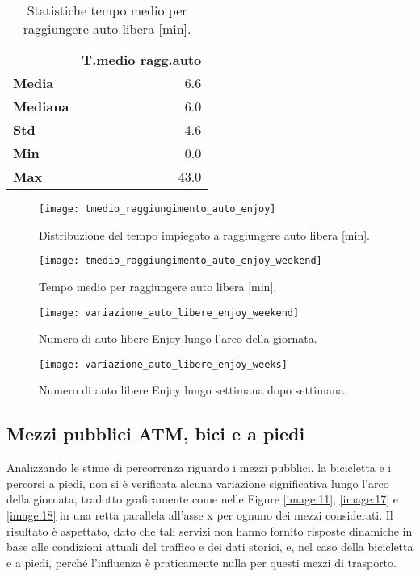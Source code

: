\begin{table}[H]
	\centering
	\begin{tabular}{ | l r | }
		\hline
		& \textbf{T.medio ragg.auto} \\
		\textbf{Media}   &  6.6 \\
		\textbf{Mediana} &  6.0 \\
		\textbf{Std}     &  4.6 \\
		\textbf{Min}     &  0.0 \\ 
		\textbf{Max}     & 43.0 \\
		\hline
	\end{tabular}
	\caption{Statistiche tempo medio per raggiungere auto libera [min].}
	\label{table:4}
\end{table}

\begin{figure}[H]
	\centering
	\texttt{[image: tmedio\_raggiungimento\_auto\_enjoy]}
	\caption{Distribuzione del tempo impiegato a raggiungere auto libera [min].}
	\label{image:8}
\end{figure}

\begin{figure}
	\centering
	\texttt{[image: tmedio\_raggiungimento\_auto\_enjoy\_weekend]}
	\caption{Tempo medio per raggiungere auto libera [min].}
	\label{image:21}
\end{figure}

\begin{figure}
	\centering
	\texttt{[image: variazione\_auto\_libere\_enjoy\_weekend]}
	\caption{Numero di auto libere Enjoy lungo l'arco della giornata.}
	\label{image:9}
\end{figure}

\begin{figure}
\centering
\texttt{[image: variazione\_auto\_libere\_enjoy\_weeks]}
\caption{Numero di auto libere Enjoy lungo settimana dopo settimana.}
\label{image:10}
\end{figure}

\pagebreak

\subsection{Mezzi pubblici ATM, bici e a piedi}

Analizzando le stime di percorrenza riguardo i mezzi pubblici, la bicicletta e i percorsi a piedi, non si è verificata alcuna variazione significativa lungo l'arco della giornata, tradotto graficamente come nelle Figure \ref{image:11}, \ref{image:17} e \ref{image:18} in una retta parallela all'asse x per ognuno dei mezzi considerati. Il risultato è aspettato, dato che tali servizi non hanno fornito risposte dinamiche in base alle condizioni attuali del traffico e dei dati storici, e, nel caso della bicicletta e a piedi, perché l'influenza è praticamente nulla per questi mezzi di trasporto.

